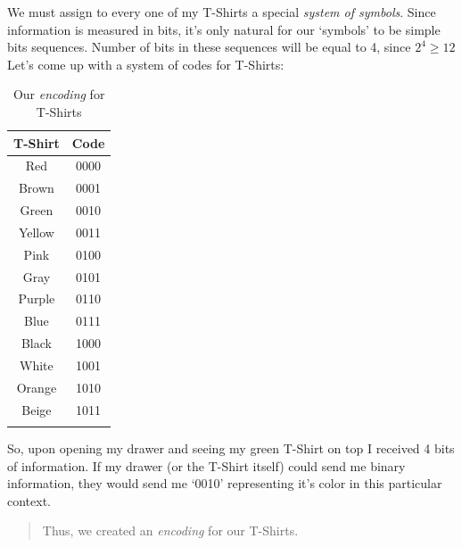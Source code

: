 \documentclass{article}
\begin{document}
            We must assign to every one of my T-Shirts a special \emph{system of symbols}. Since information is measured in bits, it's only natural for our `symbols' to 
            be simple bits sequences. Number of bits in these sequences will be equal to 4, since $2^4 \geq 12$\\
            Let's come up with a system of codes for T-Shirts:

            \begin{table}[h]
                \centering
                \begin{longtable}{|c|c|}
                    \hline
                    T-Shirt & Code \\\hline
                    Red & 0000 \\\hline
                    Brown & 0001 \\\hline
                    Green & 0010 \\\hline
                    Yellow & 0011 \\\hline
                    Pink & 0100 \\\hline
                    Gray & 0101 \\\hline
                    Purple & 0110 \\\hline
                    Blue & 0111 \\\hline
                    Black & 1000 \\\hline
                    White & 1001 \\\hline 
                    Orange & 1010 \\\hline
                    Beige & 1011 \\\hline
                    \caption{Our \emph{encoding} for T-Shirts}
                \end{longtable}
            \end{table}
            So, upon opening my drawer and seeing my green T-Shirt on top I received 4 bits of information. If my drawer (or the T-Shirt itself) could send me binary
            information, they would send me `0010' representing it's color in this particular context.\par

            \begin{quote}
                Thus, we created an \emph{encoding} for our T-Shirts.
            \end{quote}

            \newpage
\end{document}
